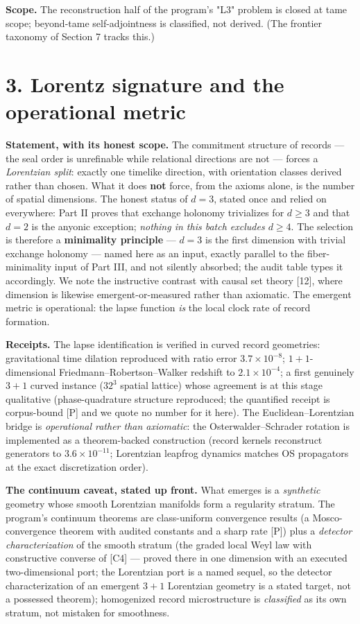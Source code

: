 \documentclass[11pt]{article}
\begin{document}
\textbf{Scope.}  The reconstruction half of the program's "L3" problem is closed at tame scope; beyond-tame self-adjointness is classified, not derived.  (The frontier taxonomy of Section 7 tracks this.)

\section*{3. Lorentz signature and the operational metric}
\textbf{Statement, with its honest scope.}  The commitment structure of records — the seal order is unrefinable while relational directions are not — forces a \emph{Lorentzian split}: exactly one timelike direction, with orientation classes derived rather than chosen. What it does \textbf{not} force, from the axioms alone, is the number of spatial dimensions.  The honest status of $d = 3$, stated once and relied on everywhere: Part II proves that exchange holonomy trivializes for $d \ge 3$ and that $d = 2$ is the anyonic exception; \emph{nothing in this batch excludes $d \ge 4$}.  The selection is therefore a \textbf{minimality principle} — $d = 3$ is the first dimension with trivial exchange holonomy — named here as an input, exactly parallel to the fiber-minimality input of Part III, and not silently absorbed; the audit table types it accordingly.  We note the instructive contrast with causal set theory [12], where dimension is likewise emergent-or-measured rather than axiomatic.  The emergent metric is operational: the lapse function \emph{is} the local clock rate of record formation.

\textbf{Receipts.}  The lapse identification is verified in curved record geometries: gravitational time dilation reproduced with ratio error $3.7\times 10^{-8}$; $1{+}1$-dimensional Friedmann–Robertson–Walker redshift to $2.1\times 10^{-4}$; a first genuinely $3{+}1$ curved instance ($32^3$ spatial lattice) whose agreement is at this stage qualitative (phase-quadrature structure reproduced; the quantified receipt is corpus-bound [P] and we quote no number for it here).  The Euclidean–Lorentzian bridge is \emph{operational rather than axiomatic}: the Osterwalder–Schrader rotation is implemented as a theorem-backed construction (record kernels reconstruct generators to $3.6\times 10^{-11}$; Lorentzian leapfrog dynamics matches OS propagators at the exact discretization order).

\textbf{The continuum caveat, stated up front.}  What emerges is a \emph{synthetic} geometry whose smooth Lorentzian manifolds form a regularity stratum.  The program's continuum theorems are class-uniform convergence results (a Mosco-convergence theorem with audited constants and a sharp rate [P]) plus a \emph{detector characterization} of the smooth stratum (the graded local Weyl law with constructive converse of [C4] — proved there in one dimension with an executed two-dimensional port; the Lorentzian port is a named sequel, so the detector characterization of an emergent $3{+}1$ Lorentzian geometry is a stated target, not a possessed theorem); homogenized record microstructure is \emph{classified} as its own stratum, not mistaken for smoothness.
\end{document}
